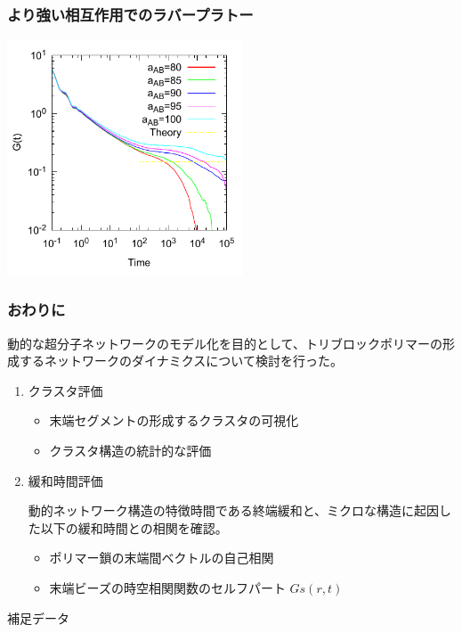 \documentclass[12pt, dvipdfmx]{beamer}
\begin{document}
\begin{frame}
\frametitle{より強い相互作用でのラバープラトー}

\centering
		\includegraphics[width=7cm]{./fig/gt_long_all.pdf}
\end{frame}


\begin{frame}
\frametitle{おわりに}

動的な超分子ネットワークのモデル化を目的として、トリブロックポリマーの形成するネットワークのダイナミクスについて検討を行った。

	\begin{enumerate}
		\item
		クラスタ評価
		\begin{itemize}
			\item
			末端セグメントの形成するクラスタの可視化
			\item
			クラスタ構造の統計的な評価
		\end{itemize}
		\item
		緩和時間評価
		
		動的ネットワーク構造の特徴時間である終端緩和と、ミクロな構造に起因した以下の緩和時間との相関を確認。
		\begin{itemize}
		\item
		ポリマー鎖の末端間ベクトルの自己相関
		\item
		末端ビーズの時空相関関数のセルフパート $Gs(r,t)$
		\end{itemize}
	\end{enumerate}

\end{frame}

\begin{frame}
\LARGE{補足データ}
\end{frame}
\end{document}
